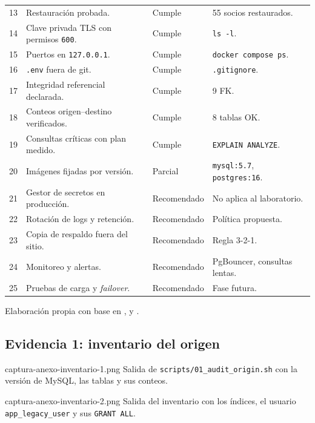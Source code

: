 \begin{table}[H]
{\begin{tablaAPA}
\begin{tabular}{@{}C{0.7cm}L{6.0cm}L{2.2cm}L{5.0cm}@{}}
        13 & Restauración probada. & Cumple & 55 socios restaurados. \\
        14 & Clave privada TLS con permisos \texttt{600}. & Cumple & \texttt{ls -l}. \\
        15 & Puertos en \texttt{127.0.0.1}. & Cumple & \texttt{docker compose ps}. \\
        16 & \texttt{.env} fuera de git. & Cumple & \texttt{.gitignore}. \\
        17 & Integridad referencial declarada. & Cumple & 9 FK. \\
        18 & Conteos origen--destino verificados. & Cumple & 8 tablas OK. \\
        19 & Consultas críticas con plan medido. & Cumple & \texttt{EXPLAIN ANALYZE}. \\
        20 & Imágenes fijadas por versión. & Parcial & \texttt{mysql:5.7}, \texttt{postgres:16}. \\
        21 & Gestor de secretos en producción. & Recomendado & No aplica al laboratorio. \\
        22 & Rotación de logs y retención. & Recomendado & Política propuesta. \\
        23 & Copia de respaldo fuera del sitio. & Recomendado & Regla 3-2-1. \\
        24 & Monitoreo y alertas. & Recomendado & PgBouncer, consultas lentas. \\
        25 & Pruebas de carga y \emph{failover}. & Recomendado & Fase futura. \\
        \bottomrule
      \end{tabular}
    \end{tablaAPA}%
  }{Elaboración propia con base en \citet{cis2024postgres}, \citet{owasp2023asvs} y \citet{nist80053}.}
\end{table}

\subsection{Evidencia 1: inventario del origen}

%
  {captura-anexo-inventario-1.png}%
  {Salida de \texttt{scripts/01\_audit\_origin.sh} con la versión de MySQL, las tablas y sus conteos.}

%
  {captura-anexo-inventario-2.png}%
  {Salida del inventario con los índices, el usuario \texttt{app\_legacy\_user} y sus \texttt{GRANT ALL}.}

